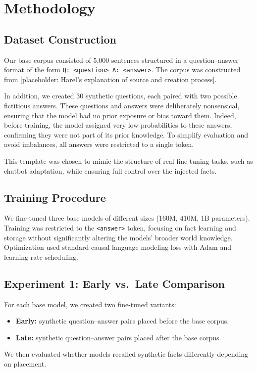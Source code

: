 \documentclass[11pt]{article}
\begin{document}
\section{Methodology}

\subsection{Dataset Construction}
Our base corpus consisted of 5{,}000 sentences structured in a question–answer format of the form \texttt{Q: <question> A: <answer>}. The corpus was constructed from [placeholder: Harel’s explanation of source and creation process].

In addition, we created 30 synthetic questions, each paired with two possible fictitious answers. These questions and answers were deliberately nonsensical, ensuring that the model had no prior exposure or bias toward them. Indeed, before training, the model assigned very low probabilities to these answers, confirming they were not part of its prior knowledge. To simplify evaluation and avoid imbalances, all answers were restricted to a single token.

This template was chosen to mimic the structure of real fine-tuning tasks, such as chatbot adaptation, while ensuring full control over the injected facts.

\subsection{Training Procedure}
We fine-tuned three base models of different sizes (160M, 410M, 1B parameters). Training was restricted to the \texttt{<answer>} token, focusing on fact learning and storage without significantly altering the models’ broader world knowledge. Optimization used standard causal language modeling loss with Adam and learning-rate scheduling.

\subsection{Experiment 1: Early vs.\ Late Comparison}
For each base model, we created two fine-tuned variants:
\begin{itemize}
    \item \textbf{Early:} synthetic question–answer pairs placed before the base corpus.
    \item \textbf{Late:} synthetic question–answer pairs placed after the base corpus.
\end{itemize}
We then evaluated whether models recalled synthetic facts differently depending on placement.
\end{document}
